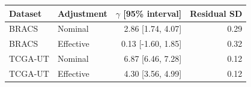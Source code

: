 \begin{tabular}{@{}llrr@{}}
\toprule
Dataset & Adjustment & $\gamma$ [95\% interval] & Residual SD \\
\midrule
BRACS & Nominal & 2.86 [1.74, 4.07] & 0.29 \\
BRACS & Effective & 0.13 [-1.60, 1.85] & 0.32 \\
TCGA-UT & Nominal & 6.87 [6.46, 7.28] & 0.12 \\
TCGA-UT & Effective & 4.30 [3.56, 4.99] & 0.12 \\
\bottomrule
\end{tabular}
